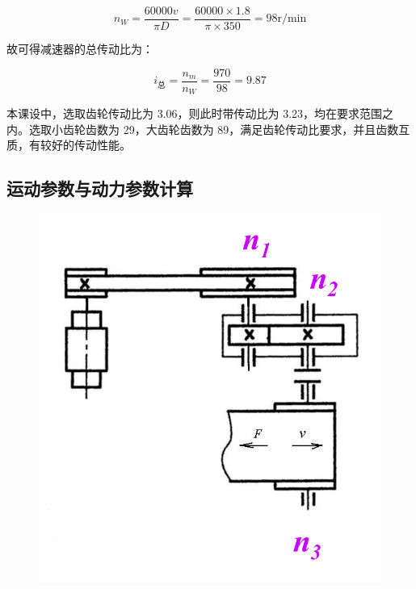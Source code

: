 \documentclass[12pt]{ctexart}
\begin{document}
$$n_W = \frac{60000v}{\pi D} = \frac{60000\times 1.8}{\pi \times 350} = 98\text{r/min}$$

故可得减速器的总传动比为：

$$i_\text{总} = \frac{n_m}{n_W}=\frac{970}{98}=9.87$$

本课设中，选取齿轮传动比为 3.06，则此时带传动比为 3.23，均在要求范围之内。选取小齿轮齿数为 29，大齿轮齿数为 89，满足齿轮传动比要求，并且齿数互质，有较好的传动性能。

\subsection{运动参数与动力参数计算}

\begin{figure}[htbp]
    \centering
    \includegraphics[scale=0.2]{dynamic_argument.png}
    \quad

\end{figure}
\end{document}
